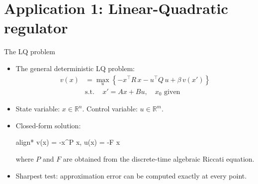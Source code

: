 \documentclass[aspectratio=169,10pt]{beamer}
\newcommand{\emphcolor}[1]{\textbf{\textcolor{emphcolorval}{#1}}}
\newcommand{\st}{\textrm{s.t.}\,}
\begin{document}

\section{\textcolor{KahouBlack}{Application 1: Linear-Quadratic regulator}}


\begin{frame}{The LQ problem}
	\begin{itemize}
		\item The general deterministic LQ problem:
		\begin{align*}
			v(x) &= \max_u \left\{ -x^\top R\, x - u^\top Q\, u + \beta\, v(x') \right\} \\
			&\st\quad x' = A x + B u, \quad x_0 \text{ given}
		\end{align*}
		\item State variable: $x\in \mathbb{R}^{n}$. Control variable: $u\in \mathbb{R}^m$.
		\item Closed-form solution:
		\begin{empheq}[box=\tcbhighmath]{align*}
			v(x) = -x^\top P x, \qquad u(x) = -F x
		\end{empheq}
		where $P$ and $F$ are obtained from the discrete-time algebraic Riccati equation.
		\item Sharpest test: approximation error can be computed exactly at every point.
	\end{itemize}
\end{frame}
\end{document}
